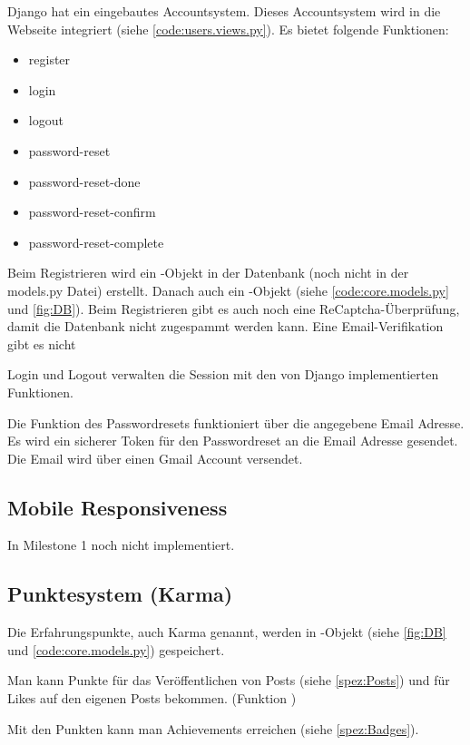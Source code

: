 Django hat ein eingebautes Accountsystem. Dieses Accountsystem wird in die
Webseite integriert (siehe \ref{code:users.views.py}). Es bietet folgende
Funktionen:
\begin{itemize}
    \item register
    \item login
    \item logout
    \item password-reset
    \item password-reset-done
    \item password-reset-confirm
    \item password-reset-complete
\end{itemize}

Beim Registrieren wird ein -Objekt in der Datenbank (noch nicht in der
models.py Datei) erstellt. Danach auch ein -Objekt (siehe
\ref{code:core.models.py} und \ref{fig:DB}). Beim Registrieren gibt es auch noch
eine ReCaptcha-Überprüfung, damit die Datenbank nicht zugespammt werden kann. Eine Email-Verifikation gibt es nicht

Login und Logout verwalten die Session mit den von Django implementierten
Funktionen.

Die Funktion des Passwordresets funktioniert über die angegebene Email Adresse.
Es wird ein sicherer Token für den Passwordreset an die Email Adresse gesendet.
Die Email wird über einen Gmail Account versendet.

\subsection{Mobile Responsiveness} \label{spez:Mobile}

In Milestone 1 noch nicht implementiert.

\subsection{Punktesystem (Karma)} \label{spez:Karma}

Die Erfahrungspunkte, auch Karma genannt, werden in -Objekt (siehe
\ref{fig:DB} und \ref{code:core.models.py}) gespeichert.

Man kann Punkte für das Veröffentlichen von Posts (siehe \ref{spez:Posts}) und für
Likes auf den eigenen Posts bekommen. (Funktion )

Mit den Punkten kann man Achievements erreichen (siehe \ref{spez:Badges}).

